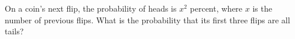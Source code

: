On a coin's next flip, the probability of heads is $ x^2 $ percent, where $ x $ is the number of previous flips. What is the probability that its first three flips are all tails?
